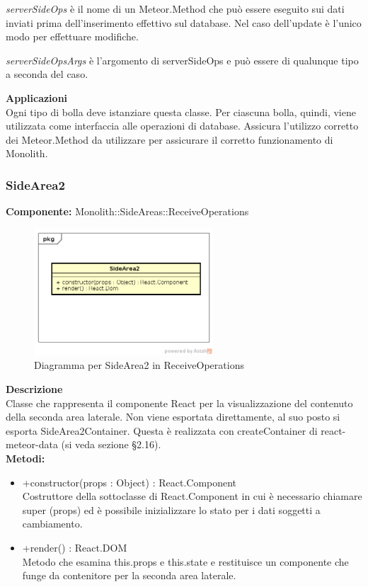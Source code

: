 \emph{serverSideOps} è il nome di un Meteor.Method che può essere eseguito sui dati inviati prima dell'inserimento effettivo sul database. Nel caso dell'update è l'unico modo per effettuare modifiche. 

\emph{serverSideOpsArgs} è l'argomento di serverSideOps e può essere di qualunque tipo a seconda del caso. 


\textbf{Applicazioni}\\
Ogni tipo di bolla deve istanziare questa classe. Per ciascuna bolla, quindi, viene utilizzata come interfaccia alle operazioni di database. Assicura l'utilizzo corretto dei Meteor.Method da utilizzare per assicurare il corretto funzionamento di Monolith. 


\clearpage

\subsubsection{SideArea2}
\textbf{Componente:}  Monolith::SideAreas::ReceiveOperations\\
   \FloatBarrier
   \begin{figure}[ht]
   \centering
   \includegraphics[width=0.6\textwidth]{img/single-SideArea2.png}
   \caption{{Diagramma per SideArea2 in ReceiveOperations}}
\end{figure}
\FloatBarrier
\textbf{Descrizione}\\
Classe che rappresenta il componente React per la visualizzazione del contenuto della seconda area laterale.
Non viene esportata direttamente, al suo posto si esporta SideArea2Container. Questa è realizzata con createContainer di react-meteor-data (si veda sezione \S 2.16).
 \\
\textbf{Metodi:} 
\begin{itemize}

\item +constructor(props : Object) : React.Component 
\\
Costruttore della sottoclasse di React.Component in cui è necessario chiamare super (props) ed è possibile inizializzare lo stato per i dati soggetti a cambiamento.

\item +render() : React.DOM 
\\
Metodo che esamina this.props e this.state e restituisce un componente che funge da contenitore per la seconda area laterale.

\end{itemize}


